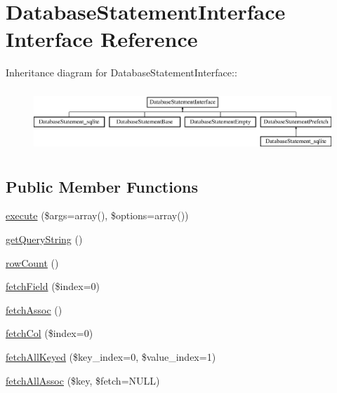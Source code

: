 \hypertarget{interfaceDatabaseStatementInterface}{
\section{DatabaseStatementInterface Interface Reference}
\label{interfaceDatabaseStatementInterface}
}
Inheritance diagram for DatabaseStatementInterface::\begin{figure}[H]
\begin{center}
\leavevmode
\includegraphics[height=2.37288cm]{interfaceDatabaseStatementInterface}
\end{center}
\end{figure}
\subsection*{Public Member Functions}
\begin{DoxyCompactItemize}
\item 
\hyperlink{interfaceDatabaseStatementInterface_a716e454a44a7667f7a90b90c1a6fe3eb}{execute} (\$args=array(), \$options=array())
\item 
\hyperlink{interfaceDatabaseStatementInterface_a2c248a565c623713d8e5ddf0ba83880d}{getQueryString} ()
\item 
\hyperlink{interfaceDatabaseStatementInterface_a97657e1cf89c6e1700f7bfa0e90deaf5}{rowCount} ()
\item 
\hyperlink{interfaceDatabaseStatementInterface_a66325e9222c90de0fc87c201652be9e4}{fetchField} (\$index=0)
\item 
\hyperlink{interfaceDatabaseStatementInterface_a754f04359c97c0866f5d80e785a24299}{fetchAssoc} ()
\item 
\hyperlink{interfaceDatabaseStatementInterface_a1c66bf4ef84ffd4710fa6545974cdf23}{fetchCol} (\$index=0)
\item 
\hyperlink{interfaceDatabaseStatementInterface_a9ffce739d0b144c36fc60b0a7e8a9824}{fetchAllKeyed} (\$key\_\-index=0, \$value\_\-index=1)
\item 
\hyperlink{interfaceDatabaseStatementInterface_a8be68ba0a27dc2f5358c5bcf3243108b}{fetchAllAssoc} (\$key, \$fetch=NULL)
\end{DoxyCompactItemize}


